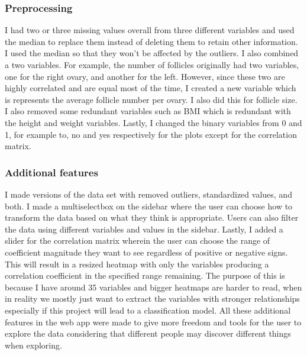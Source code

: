 \documentclass[
  8pt,
]{article}
\begin{document}
\hypertarget{preprocessing}{%
\subsubsection{Preprocessing}\label{preprocessing}}

I had two or three missing values overall from three different variables
and used the median to replace them instead of deleting them to retain
other information. I used the median so that they won't be affected by
the outliers. I also combined a two variables. For example, the number
of follicles originally had two variables, one for the right ovary, and
another for the left. However, since these two are highly correlated and
are equal most of the time, I created a new variable which is represents
the average follicle number per ovary. I also did this for follicle
size. I also removed some redundant variables such as BMI which is
redundant with the height and weight variables. Lastly, I changed the
binary variables from 0 and 1, for example to, no and yes respectively
for the plots except for the correlation matrix.

\hypertarget{additional-features}{%
\subsubsection{Additional features}\label{additional-features}}

I made versions of the data set with removed outliers, standardized
values, and both. I made a multiselectbox on the sidebar where the user
can choose how to transform the data based on what they think is
appropriate. Users can also filter the data using different variables
and values in the sidebar. Lastly, I added a slider for the correlation
matrix wherein the user can choose the range of coefficient magnitude
they want to see regardless of positive or negative signs. This will
result in a resized heatmap with only the variables producing a
correlation coefficient in the specified range remaining. The purpose of
this is because I have around 35 variables and bigger heatmaps are
harder to read, when in reality we mostly just want to extract the
variables with stronger relationships especially if this project will
lead to a classification model. All these additional features in the web
app were made to give more freedom and tools for the user to explore the
data considering that different people may discover different things
when exploring.
\end{document}
